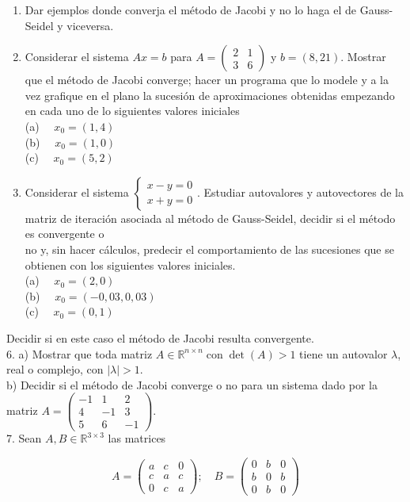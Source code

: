 \documentclass[10pt]{book}
\begin{document}
\begin{enumerate}
  \item Dar ejemplos donde converja el método de Jacobi y no lo haga el de Gauss-Seidel y viceversa.
  \item Considerar el sistema $A x=b$ para $A=\left(\begin{array}{ll}2 & 1 \\ 3 & 6\end{array}\right)$ y $b=(8,21)$. Mostrar que el método de Jacobi converge; hacer un programa que lo modele y a la vez grafique en el plano la sucesión de aproximaciones obtenidas empezando en cada uno de lo siguientes valores iniciales\\
(a) $\quad x_{0}=(1,4)$\\
(b) $\quad x_{0}=(1,0)$\\
(c) $\quad x_{0}=(5,2)$
  \item Considerar el sistema $\left\{\begin{array}{l}x-y=0 \\ x+y=0\end{array}\right.$. Estudiar autovalores y autovectores de la matriz de iteración asociada al método de Gauss-Seidel, decidir si el método es convergente o\\
no y, sin hacer cálculos, predecir el comportamiento de las sucesiones que se obtienen con los siguientes valores iniciales.\\
(a) $\quad x_{0}=(2,0)$\\
(b) $\quad x_{0}=(-0,03,0,03)$\\
(c) $\quad x_{0}=(0,1)$
\end{enumerate}

Decidir si en este caso el método de Jacobi resulta convergente.\\
6. a) Mostrar que toda matriz $A \in \mathbb{R}^{n \times n} \operatorname{con} \operatorname{det}(A)>1$ tiene un autovalor $\lambda$, real o complejo, con $|\lambda|>1$.\\
b) Decidir si el método de Jacobi converge o no para un sistema dado por la matriz $A=\left(\begin{array}{ccc}-1 & 1 & 2 \\ 4 & -1 & 3 \\ 5 & 6 & -1\end{array}\right)$.\\
7. Sean $A, B \in \mathbb{R}^{3 \times 3}$ las matrices

$$
A=\left(\begin{array}{ccc}
a & c & 0 \\
c & a & c \\
0 & c & a
\end{array}\right) ; \quad B=\left(\begin{array}{ccc}
0 & b & 0 \\
b & 0 & b \\
0 & b & 0
\end{array}\right)
$$
\end{document}
